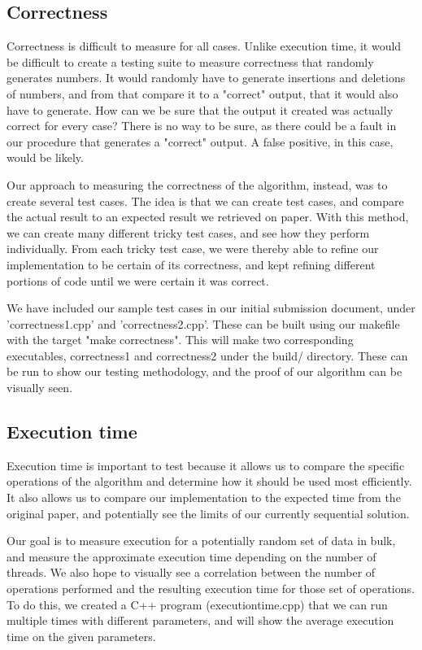 \documentclass[journal]{IEEEtran}
\begin{document}
\subsection{Correctness}

Correctness is difficult to measure for all cases. Unlike execution time, it would be difficult to create a testing suite to measure correctness that randomly generates numbers. It would randomly have to generate insertions and deletions of numbers, and from that compare it to a "correct" output, that it would also have to generate. How can we be sure that the output it created was actually correct for every case? There is no way to be sure, as there could be a fault in our procedure that generates a "correct" output. A false positive, in this case, would be likely.

Our approach to measuring the correctness of the algorithm, instead, was to create several test cases. The idea is that we can create test cases, and compare the actual result to an expected result we retrieved on paper. With this method, we can create many different tricky test cases, and see how they perform individually. From each tricky test case, we were thereby able to refine our implementation to be certain of its correctness, and kept refining different portions of code until we were certain it was correct.

We have included our sample test cases in our initial submission document, under 'correctness1.cpp' and 'correctness2.cpp'. These can be built using our makefile with the target "make correctness". This will make two corresponding executables, correctness1 and correctness2 under the build/ directory. These can be run to show our testing methodology, and the proof of our algorithm can be visually seen.

\subsection{Execution time}

Execution time is important to test because it allows us to compare the specific operations of the algorithm and determine how it should be used most efficiently. It also allows us to compare our implementation to the expected time from the original paper, and potentially see the limits of our currently sequential solution.

Our goal is to measure execution for a potentially random set of data in bulk, and measure the approximate execution time depending on the number of threads. We also hope to visually see a correlation between the number of operations performed and the resulting execution time for those set of operations. To do this, we created a C++ program (executiontime.cpp) that we can run multiple times with different parameters, and will show the average execution time on the given parameters.
\end{document}
